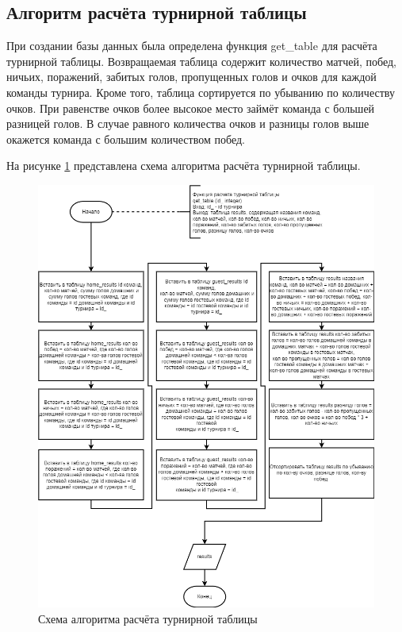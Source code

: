 \subsection{Алгоритм расчёта турнирной таблицы}
При создании базы данных была определена функция get\_table для расчёта турнирной таблицы. Возвращаемая таблица содержит количество матчей, побед, ничьих, поражений, забитых голов, пропущенных голов и очков для каждой команды турнира. Кроме того, таблица сортируется по убыванию по количеству очков. При равенстве очков более высокое место займёт команда с большей разницей голов. В случае равного количества очков и разницы голов выше окажется команда с большим количеством побед.

На рисунке \ref{img:block} представлена схема алгоритма расчёта турнирной таблицы.
\begin{figure}
  \centering
  \includegraphics[scale=0.6]{inc/block}
  \caption{Схема алгоритма расчёта турнирной таблицы}
  \label{img:block}
\end{figure}

